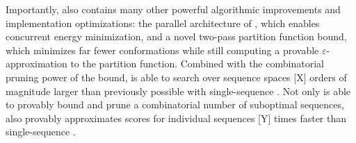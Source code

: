 Importantly, \bbks also contains many other powerful algorithmic improvements and implementation optimizations: the parallel architecture of \bbks, which enables concurrent energy minimization, and a novel two-pass partition function bound, which minimizes far fewer conformations while still computing a provable $\varepsilon$-approximation to the partition function. Combined with the combinatorial pruning power of the \msbound bound, \bbks is able to search over sequence spaces [X] orders of magnitude larger than previously possible with single-sequence \ks. Not only is \bbks able to provably bound and prune a combinatorial number of suboptimal sequences, \bbks also provably approximates \ks scores for individual sequences [Y] times faster than single-sequence \ks.